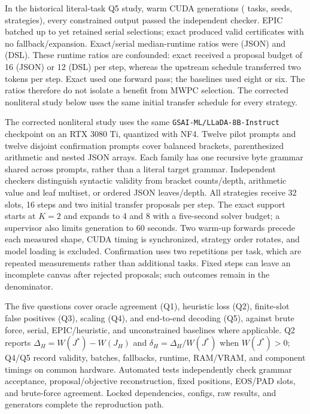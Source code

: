 In the historical literal-task Q5 study, \MThirteenQFiveRows{} warm CUDA generations (\MThirteenQFiveTasks{} tasks, \MThirteenQFiveSeeds{} seeds, \MThirteenQFiveStrategies{} strategies), every constrained output passed the independent checker. EPIC batched up to \MThirteenQFiveEpicMaxBatch{} yet retained serial selections; exact produced \MThirteenQFiveExactCertificates{} valid certificates with no fallback/expansion. Exact/serial median-runtime ratios were \MThirteenQFiveJsonRatio{} (JSON) and \MThirteenQFiveDslRatio{} (DSL). These runtime ratios are confounded: exact received a proposal budget of 16 (JSON) or 12 (DSL) per step, whereas the upstream schedule transferred two tokens per step. Exact used one forward pass; the baselines used eight or six. The ratios therefore do not isolate a benefit from MWPC selection. The corrected nonliteral study below uses the same initial transfer schedule for every strategy.

The corrected nonliteral study uses the same \texttt{GSAI-ML/LLaDA-8B-Instruct} checkpoint on an RTX 3080 Ti, quantized with NF4. Twelve pilot prompts and twelve disjoint confirmation prompts cover balanced brackets, parenthesized arithmetic and nested JSON arrays. Each family has one recursive byte grammar shared across prompts, rather than a literal target grammar. Independent checkers distinguish syntactic validity from bracket counts/depth, arithmetic value and leaf multiset, or ordered JSON leaves/depth. All strategies receive 32 slots, 16 steps and two initial transfer proposals per step. The exact support starts at $K=2$ and expands to 4 and 8 with a five-second solver budget; a supervisor also limits generation to 60 seconds. Two warm-up forwards precede each measured shape, CUDA timing is synchronized, strategy order rotates, and model loading is excluded. Confirmation uses two repetitions per task, which are repeated measurements rather than additional tasks. Fixed steps can leave an incomplete canvas after rejected proposals; such outcomes remain in the denominator.

The five questions cover oracle agreement (Q1), heuristic loss (Q2), finite-slot false positives (Q3), scaling (Q4), and end-to-end decoding (Q5), against brute force, serial, EPIC/heuristic, and unconstrained baselines where applicable. Q2 reports $\Delta_H=W(J^*)-W(J_H)$ and $\delta_H=\Delta_H/W(J^*)$ when $W(J^*)>0$; Q4/Q5 record validity, batches, fallbacks, runtime, RAM/VRAM, and component timings on common hardware. Automated tests independently check grammar acceptance, proposal/objective reconstruction, fixed positions, EOS/PAD slots, and brute-force agreement. Locked dependencies, configs, raw results, and generators complete the reproduction path.

